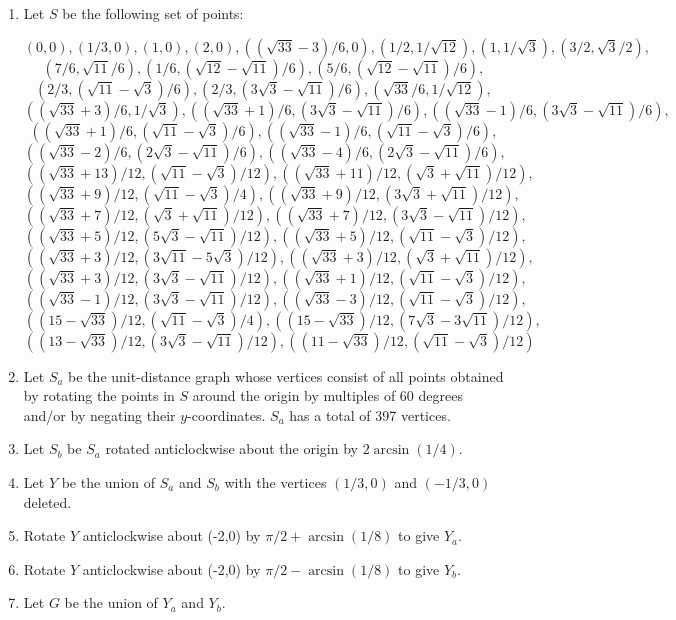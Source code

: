 \documentclass{amsart}
\theoremstyle{definition}
\theoremstyle{remark}
\numberwithin{equation}{section}
\begin{document}
\begin{enumerate}
\item Let $S$ be the following set of points:

\[(0, 0), (1/3, 0), (1, 0), (2, 0), ((\sqrt{33} - 3)/6, 0),
(1/2, 1/\sqrt{12}), (1, 1/\sqrt{3}), (3/2, \sqrt{3}/2),\]
\[(7/6, \sqrt{11}/6),
(1/6, (\sqrt{12} - \sqrt{11})/6), (5/6, (\sqrt{12} - \sqrt{11})/6),\]
\[(2/3, (\sqrt{11} - \sqrt{3})/6), (2/3, (3\sqrt{3} - \sqrt{11})/6),(\sqrt{33}/6, 1/\sqrt{12}),\]
\[((\sqrt{33} + 3)/6, 1/\sqrt{3}),
((\sqrt{33} + 1)/6, (3\sqrt{3} - \sqrt{11})/6),
((\sqrt{33} - 1)/6, (3\sqrt{3} - \sqrt{11})/6),\]
\[((\sqrt{33} + 1)/6, (\sqrt{11} - \sqrt{3})/6),
((\sqrt{33} - 1)/6, (\sqrt{11} - \sqrt{3})/6),\]
\[((\sqrt{33} - 2)/6, (2\sqrt{3} - \sqrt{11})/6),
((\sqrt{33} - 4)/6, (2\sqrt{3} - \sqrt{11})/6),\]
\[((\sqrt{33} + 13)/12, (\sqrt{11} - \sqrt{3})/12),
((\sqrt{33} + 11)/12, (\sqrt{3} + \sqrt{11})/12),\]
\[((\sqrt{33} + 9)/12, (\sqrt{11} - \sqrt{3})/4),
((\sqrt{33} + 9)/12, (3\sqrt{3} + \sqrt{11})/12),\]
\[((\sqrt{33} + 7)/12, (\sqrt{3} + \sqrt{11})/12),
((\sqrt{33} + 7)/12, (3\sqrt{3} - \sqrt{11})/12),\]
\[((\sqrt{33} + 5)/12, (5\sqrt{3} - \sqrt{11})/12),
((\sqrt{33} + 5)/12, (\sqrt{11} - \sqrt{3})/12),\]
\[((\sqrt{33} + 3)/12, (3\sqrt{11} - 5\sqrt{3})/12),
((\sqrt{33} + 3)/12, (\sqrt{3} + \sqrt{11})/12),\]
\[((\sqrt{33} + 3)/12, (3\sqrt{3} - \sqrt{11})/12),
((\sqrt{33} + 1)/12, (\sqrt{11} - \sqrt{3})/12),\]
\[((\sqrt{33} - 1)/12, (3\sqrt{3} - \sqrt{11})/12),
((\sqrt{33} - 3)/12, (\sqrt{11} - \sqrt{3})/12),\]
\[((15 - \sqrt{33})/12, (\sqrt{11} - \sqrt{3})/4),
((15 - \sqrt{33})/12, (7\sqrt{3} - 3\sqrt{11})/12),\]
\[((13 - \sqrt{33})/12, (3\sqrt{3} - \sqrt{11})/12),
((11 - \sqrt{33})/12, (\sqrt{11} - \sqrt{3})/12)\]

\item Let $S_a$ be the unit-distance graph whose vertices consist of all points obtained by rotating the points in $S$ around the origin by multiples of 60 degrees and/or by negating their $y$-coordinates. $S_a$ has a total of 397 vertices.

\item Let $S_b$ be $S_a$ rotated anticlockwise about the origin by \(2 \arcsin(1/4)\).

\item Let $Y$ be the union of $S_a$ and $S_b$ with the vertices \((1/3,0)\) and \((-1/3,0)\) deleted.

\item Rotate $Y$ anticlockwise about (-2,0) by \(\pi/2 + \arcsin(1/8)\) to give $Y_a$.

\item Rotate $Y$ anticlockwise about (-2,0) by \(\pi/2 - \arcsin(1/8)\) to give $Y_b$.

\item Let $G$ be the union of $Y_a$ and $Y_b$.
\end{enumerate}
\end{document}
